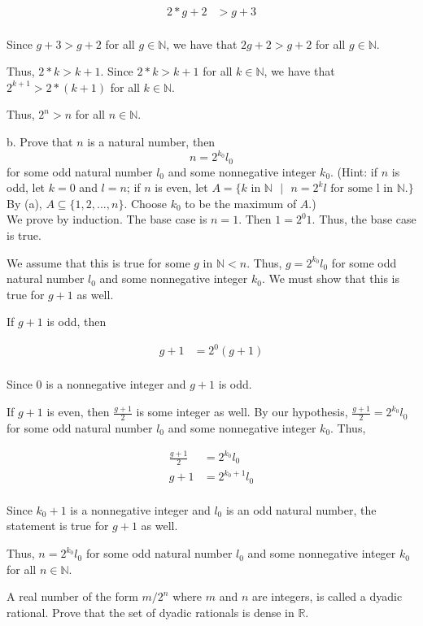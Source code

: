\documentclass[addpoints]{exam}
\begin{document}
\begin{questions}
 \\

\begin{align*}
    2 * g + 2 &> g + 3 \\
\end{align*}

Since $g + 3 > g + 2$ for all $g \in \mathbb{N}$, we have that $2g + 2 > g + 2$ for all $g \in \mathbb{N}$.

Thus, $2*k > k + 1$. Since $2 * k > k + 1$ for all $k \in \mathbb{N}$, we have that $2^{k+1} > 2 * (k + 1)$ for all $k \in \mathbb{N}$.

Thus, $2^n > n$ for all $n \in \mathbb{N}$.

b. Prove that $n$ is a natural number, then 
\[n = 2^{k_0}l_0\]
for some odd natural number $l_0$ and some nonnegative integer $k_0$. (Hint: if $n$ is odd, 
let $k= 0$ and $l = n$; if $n$ is even, let $A = \{k \text{ in } \mathbb{N} \text{ } | \text{ }
n = 2^{k}l \text{ for some } $l$ \text{ in } \mathbb{N}.\}$ By (a), $A \subseteq \{1, 2, ..., n\}$. Choose
$k_0$ to be the maximum of $A$.)\\

We prove by induction. The base case is $n = 1$. Then $1 = 2^{0}1$. Thus, the base case is true.

We assume that this is true for some $g$ in $\mathbb{N} < n$. Thus, $g = 2^{k_0}l_0$ for some
odd natural number $l_0$ and some nonnegative integer $k_0$. We must show that this is true for $g+1$
as well. 

If $g + 1$ is odd, then 

\begin{align*}
    g + 1 &= 2^0(g+1) \\
\end{align*}

Since $0$ is a nonnegative integer and $g+1$ is odd. 

If $g + 1$ is even, then $\frac{g + 1}{2}$ is some integer as well. By our 
hypothesis, $\frac{g + 1}{2} = 2^{k_0}l_0$ for some odd natural number $l_0$ and some nonnegative integer $k_0$. Thus,

\begin{align*}
    \frac{g + 1}{2} &= 2^{k_0}l_0 \\
    g + 1 &= 2^{k_0+1}l_0 \\
\end{align*}

Since $k_0 + 1$ is a nonnegative integer and $l_0$ is an odd natural number,
the statement is true for $g+1$ as well.

Thus, $n = 2^{k_0}l_0$ for some odd natural number $l_0$ and some nonnegative integer $k_0$ for all 
$n \in \mathbb{N}$.

\question A real number of the form $m/2^n$ where $m$ and $n$ are integers, is
called a dyadic rational. Prove that the set of dyadic rationals is dense in $\mathbb{R}$.\\
\end{questions}
\end{document}
